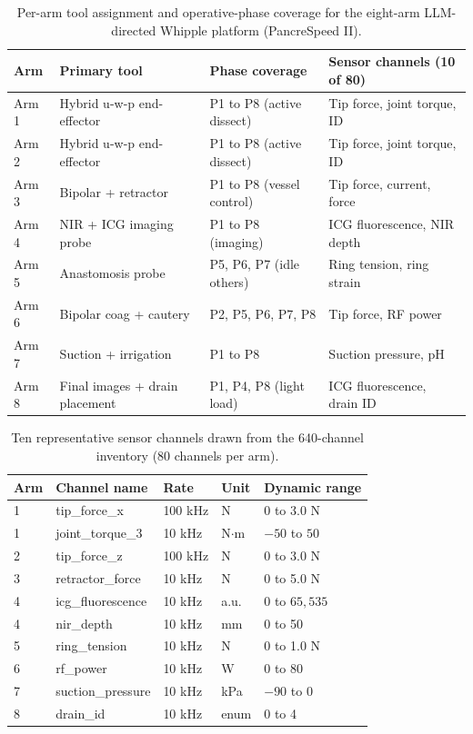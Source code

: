 \begin{table}[t]
\centering
\footnotesize
\caption{Per-arm tool assignment and operative-phase coverage for the eight-arm LLM-directed Whipple platform (PancreSpeed II).}
\label{tab:arms}
\begin{tabularx}{\textwidth}{L{1.2cm} L{4.9cm} L{4.0cm} Y}
\toprule
\textbf{Arm} & \textbf{Primary tool} & \textbf{Phase coverage} & \textbf{Sensor channels (10 of 80)} \\
\midrule
Arm 1 & Hybrid u-w-p end-effector & P1 to P8 (active dissect) & Tip force, joint torque, ID \\
Arm 2 & Hybrid u-w-p end-effector & P1 to P8 (active dissect) & Tip force, joint torque, ID \\
Arm 3 & Bipolar + retractor & P1 to P8 (vessel control) & Tip force, current, force \\
Arm 4 & NIR + ICG imaging probe & P1 to P8 (imaging) & ICG fluorescence, NIR depth \\
Arm 5 & Anastomosis probe & P5, P6, P7 (idle others) & Ring tension, ring strain \\
Arm 6 & Bipolar coag + cautery & P2, P5, P6, P7, P8 & Tip force, RF power \\
Arm 7 & Suction + irrigation & P1 to P8 & Suction pressure, pH \\
Arm 8 & Final images + drain placement & P1, P4, P8 (light load) & ICG fluorescence, drain ID \\
\bottomrule
\end{tabularx}
\end{table}

\begin{table}[t]
\centering
\footnotesize
\caption{Ten representative sensor channels drawn from the 640-channel inventory (80 channels per arm).}
\label{tab:sensors}
\begin{tabularx}{\textwidth}{L{1.0cm} L{3.8cm} L{3cm} L{2.4cm} Y}
\toprule
\textbf{Arm} & \textbf{Channel name} & \textbf{Rate} & \textbf{Unit} & \textbf{Dynamic range} \\
 & tip\_force\_x & 100 kHz & N & 0 to 3.0 N \\
1 & joint\_torque\_3 & 10 kHz & N$\cdot$m & $-50$ to $50$ \\
2 & tip\_force\_z & 100 kHz & N & 0 to 3.0 N \\
3 & retractor\_force & 10 kHz & N & 0 to 5.0 N \\
4 & icg\_fluorescence & 10 kHz & a.u. & 0 to $65{,}535$ \\
4 & nir\_depth & 10 kHz & mm & 0 to 50 \\
5 & ring\_tension & 10 kHz & N & 0 to 1.0 N \\
6 & rf\_power & 10 kHz & W & 0 to 80 \\
7 & suction\_pressure & 10 kHz & kPa & $-90$ to 0 \\
8 & drain\_id & 10 kHz & enum & 0 to 4 \\
\bottomrule
\end{tabularx}
\end{table}

